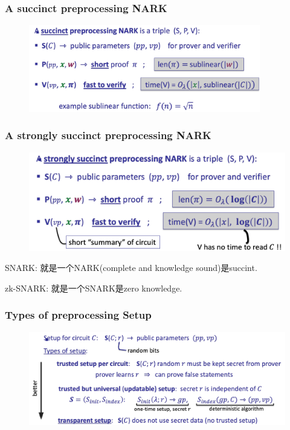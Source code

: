 \documentclass[10pt]{ctexart}
\begin{document}
\subsubsection*{A succinct preprocessing NARK}
\begin{figure}[H]
    \centering
    \includegraphics[width=0.9\textwidth]{./img/a_succinct_NARK.png} 
\end{figure}

\subsubsection*{A strongly succinct preprocessing NARK}
\begin{figure}[H]
    \centering
    \includegraphics[width=1\textwidth]{./img/a_strongly_succinct_NARK.png} 
\end{figure}
SNARK: 就是一个NARK(complete and knowledge sound)是succint.

zk-SNARK: 就是一个SNARK是zero knowledge.

\subsubsection*{Types of preprocessing Setup}
\begin{figure}[H]
    \centering
    \includegraphics[width=1\textwidth]{./img/types_of_preprocessing_setup.png} 
\end{figure}
\end{document}
